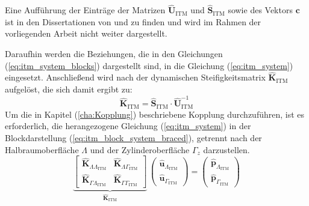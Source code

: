 Eine Aufführung der Einträge der Matrizen $\hat{\mathbf U}_{\mathrm{ITM}}$ und $\hat{\mathbf S}_{\mathrm{ITM}}$ sowie des Vektors $\mathbf{c}$ ist in den Dissertationen von \cite{Hackenberg2016} und \cite{Freisinger2022} zu finden und wird im Rahmen der vorliegenden Arbeit nicht weiter dargestellt.







Daraufhin werden die Beziehungen, die in den Gleichungen (\ref{eq:itm_system_blocks}) dargestellt sind, in die Gleichung (\ref{eq:itm_system}) eingesetzt. Anschließend wird nach der dynamischen Steifigkeitsmatrix $\hat{\mathbf K}_{\mathrm{ITM}}$ aufgelöst, die sich damit ergibt zu:
\begin{equation}\label{eq:itm_steifigkeitsm}
	\hat{\mathbf K}_{\mathrm{ITM}} = 
	\hat{\mathbf S}_{\mathrm{ITM}} \cdot \hat{\mathbf U}_{\mathrm{ITM}}^{-1}
\end{equation}
Um die in Kapitel (\ref{cha:Kopplung}) beschriebene Kopplung durchzuführen, ist es erforderlich, die herangezogene Gleichung (\ref{eq:itm_system}) in der Blockdarstellung (\ref{eq:itm_block_system_braced}), getrennt nach der Halbraumoberfläche $\Lambda$ und der Zylinderoberfläche $\Gamma_z$ darzustellen.
\begin{equation}\label{eq:itm_block_system_braced}
	\underbrace{\begin{bmatrix}
			\hat{\mathbf K}_{\Lambda\Lambda_{\mathrm{ITM}}} &
			\hat{\mathbf K}_{\Lambda\Gamma_{\mathrm{ITM}}} \\
			\hat{\mathbf K}_{\Gamma\Lambda_{\mathrm{ITM}}} &
			\hat{\mathbf K}_{\Gamma\Gamma_{\mathrm{ITM}}}
	\end{bmatrix}}_{\hat{\mathbf K}_{\mathrm{ITM}}}\,
	\begin{pmatrix}
		\hat{\mathbf u}_{\Lambda_{\mathrm{ITM}}} \\
		\hat{\mathbf u}_{\Gamma_{\mathrm{ITM}}}
	\end{pmatrix}
	=
	\begin{pmatrix}
		\hat{\mathbf p}_{\Lambda_{\mathrm{ITM}}} \\
		\hat{\mathbf p}_{\Gamma_{\mathrm{ITM}}}
	\end{pmatrix}
\end{equation}
